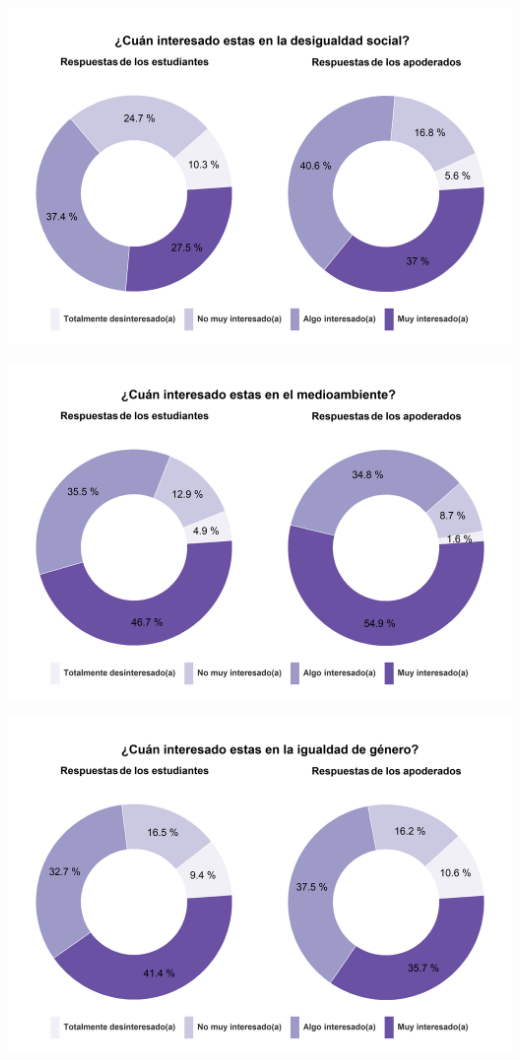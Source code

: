 \documentclass[
  14pt,
]{book}
\begin{document}
\begin{center}\includegraphics[width=52.49in]{images/graph_intdes} \end{center}

\begin{center}\includegraphics[width=52.49in]{images/graph_intmed} \end{center}

\begin{center}\includegraphics[width=52.49in]{images/graph_intgen} \end{center}
\end{document}
